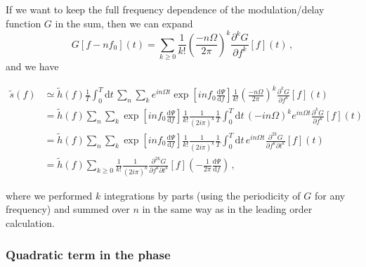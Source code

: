 \documentclass[aps,showpacs,twocolumn,prd,superscriptaddress,nofootinbib]{revtex4}
\newcommand{\be}{\begin{equation}}
\newcommand{\ee}{\end{equation}}
\newcommand\ud{{\mathrm{d}}}
\newcommand{\nn}{\nonumber}
\begin{document}
If we want to keep the full frequency dependence of the modulation/delay function $G$ in the sum, then we can expand
%
\be
	G[f-n f_{0}](t) = \sum\limits_{k\geq 0} \frac{1}{k!}\left( \frac{-n \Omega}{2\pi} \right)^{k} \frac{\partial^{k} G}{\partial f^{k}}[f](t) \,,
\ee
%
and we have
%
\begin{widetext}
\begin{align}
	\tilde{s}(f) &\simeq \tilde{h}(f) \frac{1}{T} \int_{0}^{T}\ud t\, \sum\limits_{n}\sum\limits_{k} e^{i n \Omega t} \exp\left[ i n f_{0} \frac{\ud \Psi}{\ud f} \right] \frac{1}{k!}\left( \frac{-n \Omega}{2\pi} \right)^{k} \frac{\partial^{k} G}{\partial f^{k}}[f](t) \nn\\
	&= \tilde{h}(f) \sum\limits_{n}\sum\limits_{k} \exp\left[ i n f_{0} \frac{\ud \Psi}{\ud f} \right] \frac{1}{k!} \frac{1}{(2i\pi)^{k}} \frac{1}{T} \int_{0}^{T}\ud t\, (-i n \Omega)^{k}  e^{i n \Omega t}  \frac{\partial^{k} G}{\partial f^{k}}[f](t) \nn\\
	&= \tilde{h}(f) \sum\limits_{n}\sum\limits_{k} \exp\left[ i n f_{0} \frac{\ud \Psi}{\ud f} \right] \frac{1}{k!} \frac{1}{(2i\pi)^{k}} \frac{1}{T} \int_{0}^{T}\ud t\, e^{i n \Omega t}  \frac{\partial^{2k} G}{\partial f^{k}\partial t^{k}}[f](t) \nn\\
	&= \tilde{h}(f) \sum\limits_{k\geq 0} \frac{1}{k!} \frac{1}{(2i\pi)^{k}}  \frac{\partial^{2k} G}{\partial f^{k}\partial t^{k}}[f]\left(-\frac{1}{2\pi} \frac{\ud \Psi}{\ud f} \right) \,,
\end{align}
\end{widetext}
%
where we performed $k$ integrations by parts (using the periodicity of $G$ for any frequency) and summed over $n$ in the same way as in the leading order calculation.

\subsubsection*{Quadratic term in the phase}
\end{document}
